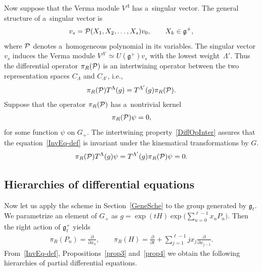 \documentclass[pdftex]{sigma}
\numberwithin{equation}{section}
\begin{document}
Now suppose that the Verma module $ V^{\Lambda} $ has a~singular vector.
The general structure of a~singular vector is
\begin{gather*}
v_s = {\cal P}(X_1, X_2, \dots, X_s) v_0,
\qquad
X_k \in {\mathfrak g}^+,
\end{gather*}
where $\cal P$ denotes a~homogeneous polynomial in its variables.
The singular vector~$ v_s $ induces the Verma module $ V^{\Lambda'} \simeq U({\mathfrak g}^+) v_s $ with the lowest
weight~$ \Lambda'$.
Thus the dif\/ferential operator $ \pi_R({\cal P}) $ is an intertwining operator between the two representation spaces $
C_{\Lambda} $ and $ C_{\Lambda'}$, i.e.,
\begin{gather}
\pi_R({\cal P})  T^{\Lambda}(g) = T^{\Lambda'}(g)  \pi_R({\cal P}).
\label{DiffOpInter}
\end{gather}
Suppose that the operator $ \pi_R({\cal P}) $ has a~nontrivial kernel
\begin{gather}
\pi_R({\cal P}) \psi = 0,
\label{InvEq-def}
\end{gather}
for some function $ \psi $ on $ G_+$.
The intertwining property~\eqref{DiffOpInter} assures that the equation~\eqref{InvEq-def} is invariant under the
kinematical transformations by $ G$.
\begin{gather*}
\pi_R({\cal P})  T^{\Lambda}(g)  \psi = T^{\Lambda'}(g)  \pi_R({\cal P})  \psi = 0.
\end{gather*}

\subsection{Hierarchies of dif\/ferential equations}

Now let us apply the scheme in Section~\ref{GeneSche} to the group generated by $ {\mathfrak g}_{\ell}$.
We parametrize an element of $ G_+ $ as $g = \exp(tH)  \exp\Big(\sum\limits_{n=0}^{\ell-1} x_n P_n
\Big)$.
Then the right action of $ {\mathfrak g}_{\ell}^+ $ yields
\begin{gather*}
\pi_R(P_n) = \frac{\partial}{\partial x_n},
\qquad
\pi_R(H) = \frac{\partial}{\partial t} + \sum\limits_{j=1}^{\ell-1} j x_j \frac{\partial}{\partial x_{j-1}}.
\end{gather*}
From~\eqref{InvEq-def}, Propositions~\ref{prop3} and~\ref{prop4} we obtain the following hierarchies of
partial dif\/ferential equations.
\end{document}
